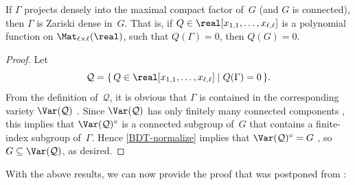 \begin{cor}
\label{BDT(Zardense)}
If\/ $\Gamma$ projects
densely into the maximal compact factor of~$G$ \textup(and $G$ is connected\/\textup), then\/
$\Gamma$ is Zariski dense in~$G$. That is, if $Q \in
\real[x_{1,1},\ldots,x_{\ell,\ell}]$ is a polynomial
function on $\Mat_{\ell \times \ell}(\real)$, such that
$Q(\Gamma) = 0$, then $Q(G) = 0$.
 \end{cor}

\begin{proof}
 Let 
 $$ \mathcal{Q} = \{\, Q \in
\real[x_{1,1},\ldots,x_{\ell,\ell}] \mid Q(\Gamma) = 0
\,\} .$$
From the definition of~$\mathcal{Q}$, it is obvious that $\Gamma$ is contained in the corresponding variety $\Var(\mathcal{Q})$ . Since
$\Var(\mathcal{Q})$ has only finitely many connected
components , this implies that
$\Var(\mathcal{Q})^\circ$ is a connected subgroup of~$G$
that contains a finite-index subgroup of~$\Gamma$. Hence
\cref{BDT-normalize} implies that
$\Var(\mathcal{Q})^\circ = G$ , so
$G \subseteq \Var(\mathcal{Q})$, as desired.
 \end{proof}

With the above results, we can now provide the proof that was postponed from :
 
